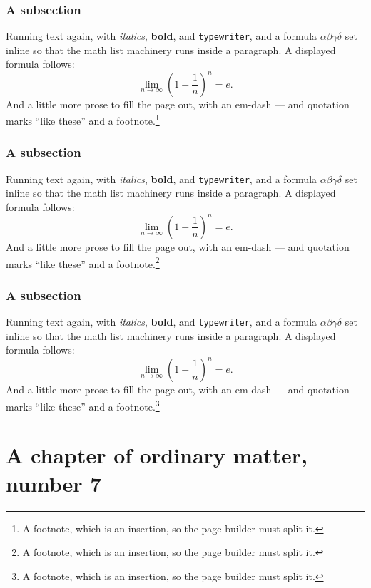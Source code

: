 \documentclass[11pt,a4paper]{report}
\theoremstyle{plain}
\begin{document}
\subsection{A subsection}
Running text again, with \textit{italics}, \textbf{bold}, and
\texttt{typewriter}, and a formula $\alpha\beta\gamma\delta$ set inline so
that the math list machinery runs inside a paragraph. A displayed formula
follows:
\[ \lim_{n\to\infty}\left(1+\frac{1}{n}\right)^{n}=e . \]
And a little more prose to fill the page out, with an em-dash --- and
quotation marks ``like these'' and a footnote.\footnote{A footnote, which is
an insertion, so the page builder must split it.}
\subsection{A subsection}
Running text again, with \textit{italics}, \textbf{bold}, and
\texttt{typewriter}, and a formula $\alpha\beta\gamma\delta$ set inline so
that the math list machinery runs inside a paragraph. A displayed formula
follows:
\[ \lim_{n\to\infty}\left(1+\frac{1}{n}\right)^{n}=e . \]
And a little more prose to fill the page out, with an em-dash --- and
quotation marks ``like these'' and a footnote.\footnote{A footnote, which is
an insertion, so the page builder must split it.}
\subsection{A subsection}
Running text again, with \textit{italics}, \textbf{bold}, and
\texttt{typewriter}, and a formula $\alpha\beta\gamma\delta$ set inline so
that the math list machinery runs inside a paragraph. A displayed formula
follows:
\[ \lim_{n\to\infty}\left(1+\frac{1}{n}\right)^{n}=e . \]
And a little more prose to fill the page out, with an em-dash --- and
quotation marks ``like these'' and a footnote.\footnote{A footnote, which is
an insertion, so the page builder must split it.}
\chapter{A chapter of ordinary matter, number 7}
\end{document}
